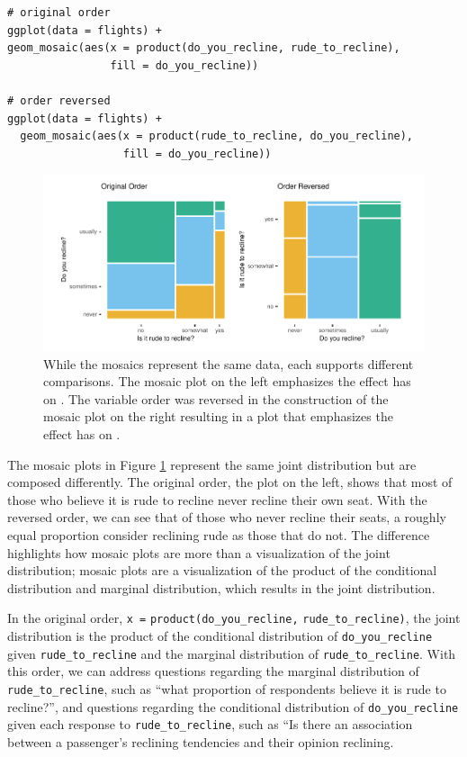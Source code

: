 \begin{verbatim}
# original order
ggplot(data = flights) +
geom_mosaic(aes(x = product(do_you_recline, rude_to_recline), 
                fill = do_you_recline))

# order reversed
ggplot(data = flights) +
  geom_mosaic(aes(x = product(rude_to_recline, do_you_recline), 
                  fill = do_you_recline))
\end{verbatim}

\begin{figure}

{\centering \includegraphics[width=1\linewidth]{jeppson-hofmann_files/figure-latex/order-1} 

}

\caption{While the mosaics represent the same data, each supports different comparisons. The mosaic plot on the left emphasizes the effect  has on . The variable order was reversed in the construction of the mosaic plot on the right resulting in a plot that emphasizes the effect  has on .}\label{fig:order}
\end{figure}

The mosaic plots in Figure \ref{fig:order} represent the same joint distribution but are composed differently. The original order, the plot on the left, shows that most of those who believe it is rude to recline never recline their own seat. With the reversed order, we can see that of those who never recline their seats, a roughly equal proportion consider reclining rude as those that do not. The difference highlights how mosaic plots are more than a visualization of the joint distribution; mosaic plots are a visualization of the product of the conditional distribution and marginal distribution, which results in the joint distribution.

In the original order, \texttt{x\ =} \texttt{product(do\_you\_recline,} \texttt{rude\_to\_recline)}, the joint distribution is the product of the conditional distribution of \texttt{do\_you\_recline} given \texttt{rude\_to\_recline} and the marginal distribution of \texttt{rude\_to\_recline}. With this order, we can address questions regarding the marginal distribution of \texttt{rude\_to\_recline}, such as ``what proportion of respondents believe it is rude to recline?'', and questions regarding the conditional distribution of \texttt{do\_you\_recline} given each response to \texttt{rude\_to\_recline}, such as ``Is there an association between a passenger's reclining tendencies and their opinion reclining.

